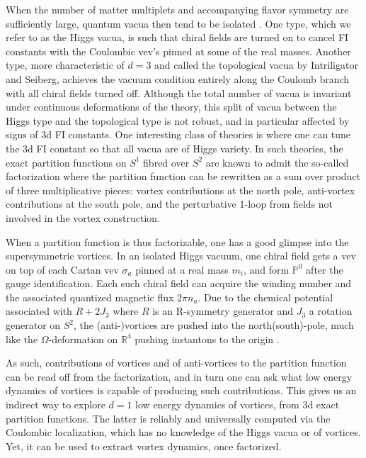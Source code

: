 \documentclass[a4paper,11pt]{article}
\begin{document}
When the number of matter multiplets and accompanying flavor
symmetry are sufficiently large, quantum vacua then tend to
be isolated \cite{Intriligator:2013lca}. One type, which we
refer to as the Higgs vacua, is such that chiral fields are
turned on to cancel FI constants with the Coulombic vev's
pinned at some of the real masses. Another type, more
characteristic of $d=3$ and called the topological vacua
by Intriligator and Seiberg,
achieves the vacuum condition entirely along the Coulomb branch
with all chiral fields turned off. Although the total number
of vacua is invariant under continuous deformations of
the theory, this split of vacua between the Higgs type and
the topological type is not robust, and in particular affected
by signs of 3d FI constants. One interesting class of theories
is where one can tune the 3d FI constant so that all vacua are of Higgs
variety. In such theories, the exact partition functions
on $S^1$ fibred over $S^2$ are known to admit the so-called
factorization \cite{Krattenthaler:2011da,Dimofte:2011ju,Pasquetti:2011fj,Beem:2012mb,Hwang:2012jh,Taki:2013opa,Cecotti:2013mba,Fujitsuka:2013fga,Benini:2013yva,Benini:2015noa} where the partition function can be rewritten
as a sum over product of three multiplicative pieces: vortex
contributions at the north pole, anti-vortex contributions
at the south pole, and the perturbative 1-loop from fields
not involved in the vortex construction.

When a partition function is thus factorizable, one has
a good glimpse into the supersymmetric vortices. In an isolated
Higgs vacuum, one chiral field gets a vev on top of
each Cartan vev $\sigma_a$ pinned at a real mass $m_i$, and
form ${\mathbb P}^0$ after the gauge identification. Each
such chiral field can acquire the winding number and the associated
quantized magnetic flux $2\pi n_a$. Due to the chemical potential
associated with $R+2 J_3$ where $R$ is an R-symmetry generator and $J_3$ a
rotation generator on $S^2$, the (anti-)vortices are pushed into
the north(south)-pole, much like the $\Omega$-deformation on
${\mathbb R}^4$ pushing instantons to the origin \cite{Nekrasov:2002qd}.

As such, contributions of vortices and of anti-vortices
to the partition function can be read off from the factorization,
and in turn one can ask what low energy dynamics of vortices
is capable of producing such contributions. This gives us
an indirect way to explore $d=1$ low energy dynamics of vortices,
from 3d exact partition functions. The latter is
reliably and universally computed via the Coulombic localization,
which  has no knowledge of the Higgs vacua or of vortices. Yet,
it can be used to extract vortex dynamics, once factorized.
\end{document}
